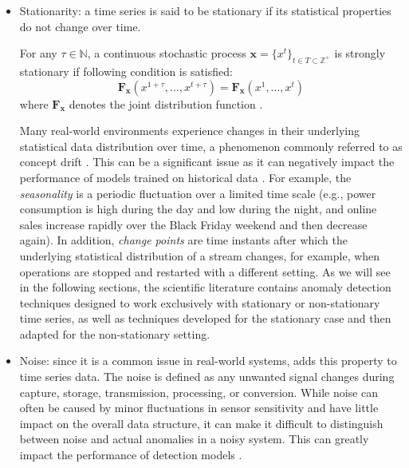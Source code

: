 \begin{itemize}
\begin{definition}
    \end{definition}    
    \item Stationarity: a time series is said to be stationary if its statistical properties do not change over time. 
    \begin{definition}
     For any $\tau \in \mathbb{N}$, a continuous stochastic process $\textbf{x}=\{x^t\}_{t \in T \subset \mathbb{Z}^+}$ is strongly stationary if following condition is satisfied:
    $$\bm{F_x}(x^{1+\tau},...,x^{t+\tau})=\bm{F_x}(x^1,...,x^t)$$ 
    where $\bm{F_x}$ denotes the joint distribution function \cite{choi2021deep}.
    \end{definition}    
    Many real-world environments experience changes in their underlying statistical data distribution over time, a phenomenon commonly referred to as concept drift \cite{Widmer_1994}. This can be a significant issue as it can negatively impact the performance of models trained on historical data \cite{Pan_2010}. For example, the \textit{seasonality} is a periodic fluctuation over a limited time scale (e.g., power consumption is high during the day and low during the night, and online sales increase rapidly over the Black Friday weekend and then decrease again). In addition, \textit{change points} are time instants after which the underlying statistical distribution of a stream changes, for example, when operations are stopped and restarted with a different setting. As we will see in the following sections, the scientific literature contains anomaly detection techniques designed to work exclusively with stationary or non-stationary time series, as well as techniques developed for the stationary case and then adapted for the non-stationary setting.
    \item Noise: since it is a common issue in real-world systems, \cite{Tang_2018} adds this property to time series data. The noise is defined as any unwanted signal changes during capture, storage, transmission, processing, or conversion. While noise can often be caused by minor fluctuations in sensor sensitivity and have little impact on the overall data structure, it can make it difficult to distinguish between noise and actual anomalies in a noisy system. This can greatly impact the performance of detection models \cite{Tuzlukov_2002}.
\end{itemize}
     
